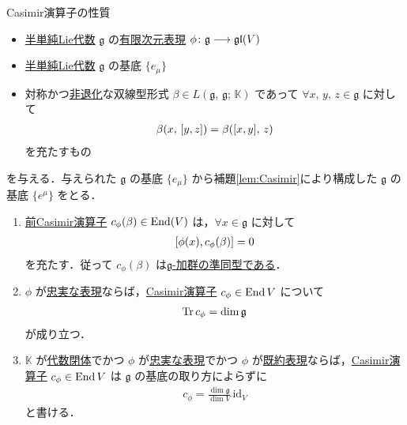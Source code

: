 \documentclass[rep_main]{subfiles}
\begin{document}
\begin{myprop}[label=prop:Casimir-basic,breakable]{Casimir演算子の性質}
	\begin{itemize}
		\item \hyperref[def:semisimple-LieAlg]{半単純Lie代数} $\mathfrak{g}$ の\underline{有限次元}\hyperref[ax:g-module]{表現} $\phi \colon \mathfrak{g} \longrightarrow \mathfrak{gl}(V)$
		\item \hyperref[de:semisimple-LieAlg]{半単純Lie代数} $\mathfrak{g}$ の基底 $\{e_\mu\}$
		\item 対称かつ\hyperref[def:radical-bilinear]{非退化}な双線型形式 $\beta \in L(\mathfrak{g},\, \mathfrak{g};\, \mathbb{K})$
		であって $\forall x,\, y,\, z \in \mathfrak{g}$ に対して
		\begin{align}
			\beta(x,\, \comm{y}{z}) = \beta (\comm{x}{y},\, z)
		\end{align}
		を充たすもの
	\end{itemize}
	を与える．与えられた $\mathfrak{g}$ の基底 $\{e_\mu\}$ から補題\ref{lem:Casimir}により構成した $\mathfrak{g}$ の基底 $\{e^\mu\}$ をとる．

	\begin{enumerate}
		\item \hyperref[def:Casimir]{前Casimir演算子} $c_{\phi}(\beta) \in \operatorname{End} (V)$ は，$\forall x \in \mathfrak{g}$ に対して
		\begin{align}
			\comm{\phi(x)}{c_\phi(\beta)} = 0
		\end{align}
		を充たす．従って $c_\phi (\beta)$ は\hyperref[def:g-module-hom]{$\mathfrak{g}$-加群の準同型である}．	
		\item $\phi$ が\hyperref[def:faithful]{忠実な表現}ならば，\hyperref[def:Casimir]{Casimir演算子} $c_\phi \in \operatorname{End} V$ について
		\begin{align}
			\Tr c_\phi = \dim \mathfrak{g}
		\end{align}
		が成り立つ．
		\item $\mathbb{K}$ が\underline{代数閉体}でかつ $\phi$ が\hyperref[def:faithful]{忠実な表現}でかつ $\phi$ が\hyperref[def:irr]{既約表現}ならば，\hyperref[def:Casimir]{Casimir演算子} $c_\phi \in \operatorname{End} V$ は $\mathfrak{g}$ の基底の取り方によらずに
		\begin{align}
			c_\phi = \frac{\dim \mathfrak{g}}{\dim V}\, \mathrm{id}_{V}
		\end{align}
		と書ける．
	\end{enumerate}
\end{myprop}
\end{document}

